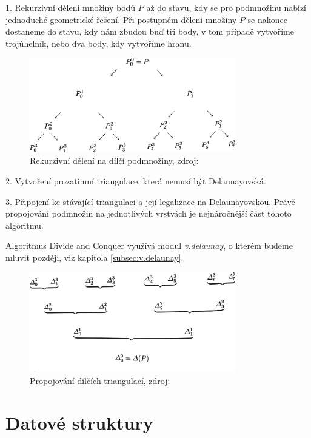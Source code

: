\documentclass[12pt,a4paper]{article}
\begin{document}
1. Rekurzivní dělení množiny bodů $P$ až do stavu, kdy se pro podmnožinu nabízí jednoduché geometrické řešení. Při postupném dělení množiny $P$ se nakonec dostaneme do stavu, kdy nám zbudou buď tři body, v tom případě vytvoříme trojúhelník, nebo dva body, kdy vytvoříme hranu.
\begin{figure}[h!]
\centering
\includegraphics[width=0.8\textwidth]{img/div_n_conq.png}
\caption{Rekurzivní dělení na dílčí podmnožiny, zdroj: \cite{triangulation}}
\label{fig:div_n_conq}
\end{figure}

2. Vytvoření prozatimní triangulace, která nemusí být Delaunayovská.

3. Připojení ke stávající triangulaci a její legalizace na Delaunayovskou. Právě propojování podmnožin na jednotlivých vrstvách je nejnáročnější část tohoto algoritmu.

\bigskip
Algoritmus Divide and Conquer využívá modul \emph{v.delaunay}, o kterém budeme mluvit později, viz kapitola \ref{subsec:v.delaunay}.

\newpage
\begin{figure}[h!]
\centering
\includegraphics[width=0.8\textwidth]{img/merge.png}
\caption{Propojování dílčích triangulací, zdroj: \cite{triangulation}}
\label{fig:merge}
\end{figure}


\newpage
\section{Datové struktury}
\label{sec:data_struct}
\end{document}
